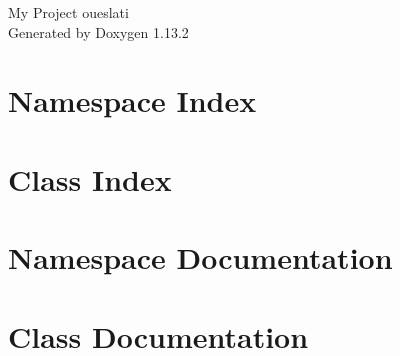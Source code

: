 \documentclass[twoside]{book}
\newcommand{\+}{\discretionary{\mbox{\scriptsize$\hookleftarrow$}}{}{}}
\newcommand{\clearemptydoublepage}{%
    \newpage{\pagestyle{empty}\cleardoublepage}%
  }
\begin{document}
  \raggedbottom
    \hypersetup{pageanchor=false,
                bookmarksnumbered=true,
                pdfencoding=unicode
               }
  \begin{titlepage}
  \vspace*{7cm}
  \begin{center}%
  {\Large My Project oueslati}\\
  \vspace*{1cm}
  {\large Generated by Doxygen 1.13.2}\\
  \end{center}
  \end{titlepage}
  \clearemptydoublepage
  \tableofcontents
  \clearemptydoublepage
  \hypersetup{pageanchor=true}
\chapter{Namespace Index}

\chapter{Class Index}

\chapter{Namespace Documentation}

\chapter{Class Documentation}

  \backmatter
  \newpage
  \clearemptydoublepage
  \printindex
\end{document}

